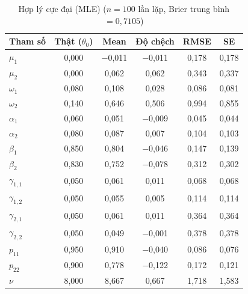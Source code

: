 \documentclass[11pt,a4paper]{article}
\begin{document}
\begin{table}[H]\centering\scriptsize
\caption{Hợp lý cực đại (MLE) ($n=100$ lần lặp, Brier trung bình $=0,7105$)}
\begin{tabularx}{\textwidth}{l C C C C C}
\toprule
\textbf{Tham số} & \textbf{Thật ($\theta_0$)} & \textbf{Mean} & \textbf{Độ chệch} & \textbf{RMSE} & \textbf{SE} \\
\midrule
$\mu_1$ & 0,000 & $-$0,011 & $-$0,011 & 0,178 & 0,178 \\
$\mu_2$ & 0,000 & 0,062 & 0,062 & 0,343 & 0,337 \\
$\omega_1$ & 0,080 & 0,108 & 0,028 & 0,086 & 0,081 \\
$\omega_2$ & 0,140 & 0,646 & 0,506 & 0,994 & 0,855 \\
$\alpha_1$ & 0,060 & 0,051 & $-$0,009 & 0,045 & 0,044 \\
$\alpha_2$ & 0,080 & 0,087 & 0,007 & 0,104 & 0,103 \\
$\beta_1$ & 0,850 & 0,804 & $-$0,046 & 0,147 & 0,139 \\
$\beta_2$ & 0,830 & 0,752 & $-$0,078 & 0,312 & 0,302 \\
$\gamma_{1,1}$ & 0,050 & 0,061 & 0,011 & 0,068 & 0,068 \\
$\gamma_{1,2}$ & 0,050 & 0,055 & 0,005 & 0,114 & 0,114 \\
$\gamma_{2,1}$ & 0,050 & 0,061 & 0,011 & 0,364 & 0,364 \\
$\gamma_{2,2}$ & 0,050 & 0,049 & $-$0,001 & 0,378 & 0,378 \\
$p_{11}$ & 0,950 & 0,910 & $-$0,040 & 0,086 & 0,076 \\
$p_{22}$ & 0,900 & 0,778 & $-$0,122 & 0,172 & 0,121 \\
$\nu$ & 8,000 & 8,667 & 0,667 & 1,718 & 1,583 \\
\bottomrule
\end{tabularx}
\end{table}
\end{document}
